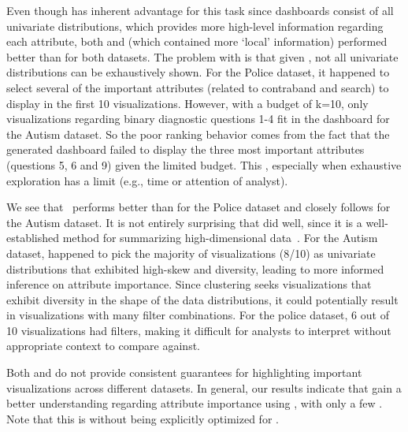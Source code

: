 \par Even though \BFS has inherent advantage for this task since \BFS dashboards consist of all univariate distributions, which provides more high-level information regarding each attribute, both \system and \cluster (which contained more `local' information) performed better than \BFS for both datasets. The problem with \BFS is that given , not all univariate distributions can be exhaustively shown. For the Police dataset, it happened to select several of the important attributes (related to contraband and search) to display in the first 10 visualizations. However, with a budget of k=10, only visualizations regarding binary diagnostic questions 1-4 fit in the dashboard for the Autism dataset. So the poor ranking behavior comes from the fact that the \BFS generated dashboard failed to display the three most important attributes (questions 5, 6 and 9) given the limited budget. This , especially when exhaustive exploration has a limit (e.g., time or attention of analyst).
\par We see that \system\ performs better than \cluster for the Police dataset and closely follows \cluster for the Autism dataset. It is not entirely surprising that \cluster did well, since it is a well-established method for summarizing high-dimensional data~\cite{Han2005}. For the Autism dataset, \cluster happened to pick the majority of visualizations (8/10) as univariate distributions that exhibited high-skew and diversity, leading to more informed inference on attribute importance. Since clustering seeks visualizations that exhibit diversity in the shape of the data distributions, it could potentially result in visualizations with many filter combinations. For the police dataset, 6 out of 10 visualizations had  filters, making it difficult for analysts to interpret  without appropriate context to compare against.
\par Both \BFS and \cluster do not provide consistent guarantees for highlighting important visualizations across different datasets. In general, our results indicate that  gain a better  understanding regarding attribute importance using \system, with only a few . Note that this is without \system being explicitly optimized for .
